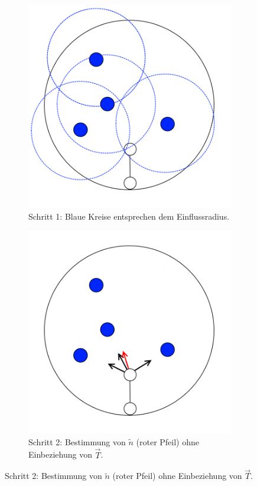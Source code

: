 \begin{figure} [hbtp]
\begin{subfigure}[t]{.31\textwidth}
		\includegraphics[width=\linewidth]{images/SCA_Basic2.png}
		\caption{Schritt 1: Blaue Kreise entsprechen dem Einflussradius.}
		\label{subfig:SCA_Basic2}
	\end{subfigure}
	\hspace{.01\textwidth}
	\begin{subfigure}[t]{.31\textwidth}
		\centering
		\includegraphics[width=\linewidth]{images/SCA_Basic3.png}
		\caption{Schritt 2: Bestimmung von $\tilde{n}$ (roter Pfeil) ohne Einbeziehung von $\overrightarrow{T}$.}
		\label{subfig:SCA_Basic3}
	\end{subfigure}


\end{figure}
